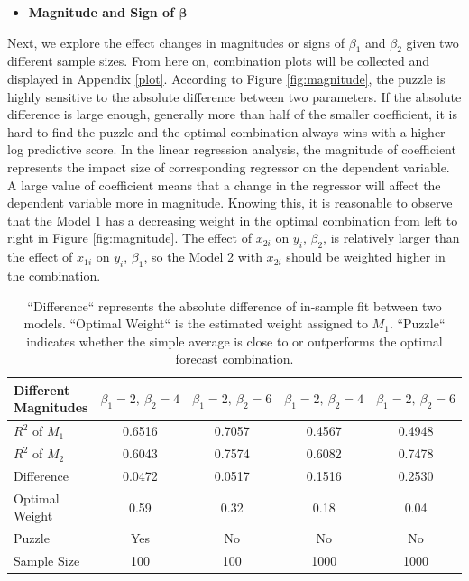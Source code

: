 \documentclass{monashthesis}
\begin{document}
\begin{itemize}
\tightlist
\item
  \bf{Magnitude and Sign of $\pmb{\beta}$}
\end{itemize}

Next, we explore the effect changes in magnitudes or signs of \(\beta_1\) and \(\beta_2\) given two different sample sizes. From here on, combination plots will be collected and displayed in Appendix \ref{plot}. According to Figure \ref{fig:magnitude}, the puzzle is highly sensitive to the absolute difference between two parameters. If the absolute difference is large enough, generally more than half of the smaller coefficient, it is hard to find the puzzle and the optimal combination always wins with a higher log predictive score. In the linear regression analysis, the magnitude of coefficient represents the impact size of corresponding regressor on the dependent variable. A large value of coefficient means that a change in the regressor will affect the dependent variable more in magnitude. Knowing this, it is reasonable to observe that the Model 1 has a decreasing weight in the optimal combination from left to right in Figure \ref{fig:magnitude}. The effect of \(x_{2i}\) on \(y_i\), \(\beta_2\), is relatively larger than the effect of \(x_{1i}\) on \(y_i\), \(\beta_1\), so the Model 2 with \(x_{2i}\) should be weighted higher in the combination.

\begin{table}[ht]
  \centering
    \begin{tabular}{l|cccc}
    \toprule
    Different Magnitudes    &  $\beta_1=2,\ \beta_2=4$   &  $\beta_1=2,\ \beta_2=6$ &  $\beta_1=2,\ \beta_2=4$  &  $\beta_1=2,\ \beta_2=6$  \\
    \midrule
    $R^2$ of $M_1$  &    0.6516    &   0.7057   &    0.4567     &   0.4948   \\
    $R^2$ of $M_2$  &    0.6043    &   0.7574   &    0.6082     &   0.7478   \\
    Difference      &    0.0472    &   0.0517   &    0.1516     &   0.2530   \\
    Optimal Weight  &     0.59     &    0.32    &     0.18      &    0.04    \\
    Puzzle          &     Yes      &     No     &      No       &     No     \\
    Sample Size     &     100      &    100     &     1000      &    1000    \\
    \bottomrule
    \end{tabular}
  \caption{``Difference`` represents the absolute difference of in-sample fit between two models. ``Optimal Weight`` is the estimated weight assigned to $M_1$. ``Puzzle`` indicates whether the simple average is close to or outperforms the optimal forecast combination.}
  \label{tab:bmag}
\end{table}
\end{document}
